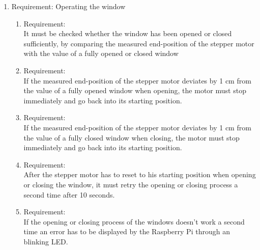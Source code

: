 \begin{enumerate}[label*=\arabic*.]
\begin{enumerate}[label*=\arabic*.]
	  \end{enumerate}  
        \item \label{req.4}  Requirement: Operating the window \\
  	\begin{enumerate}[label*=\arabic*.]
			\item \label{req.4.1}  Requirement:  \\
            It must be checked whether the window has been opened or closed sufficiently, by comparing the measured end-position of the stepper motor with the value of a fully opened or closed window\\  
			\item \label{req.4.2}  Requirement:  \\
            If the measured end-position of the stepper motor deviates by 1 cm from the value of a fully opened window when opening, the motor must stop immediately and go back into its starting position.\\   
			\item \label{req.4.3}  Requirement:  \\
			If the measured end-position of the stepper motor deviates by 1 cm from the value of a fully closed window when closing, the motor must stop immediately and go back into its starting position.\\  
			\item \label{req.4.4}  Requirement:  \\
		      After the stepper motor has to reset to his starting position when opening or closing the window, it must retry the opening or closing process a second time after 10 seconds.\\  
			\item \label{req.4.5}  Requirement:  \\
			If the opening or closing process of the windows doesn't work a second time an error has to be displayed by the Raspberry Pi through an blinking LED.\\  
	  \end{enumerate}         
	\end{enumerate}


 

